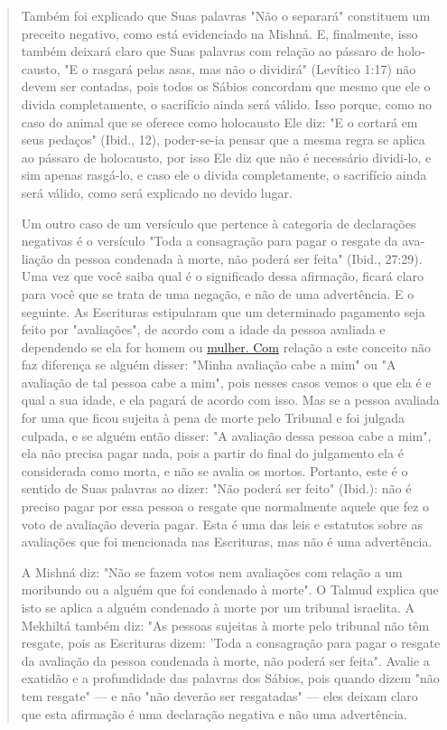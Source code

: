\begin{quote}
Também foi explicado que Suas palavras "Não o separará" consti­tuem um
preceito negativo, como está evidenciado na Mishná. E, finalmente, isso
também deixará claro que Suas palavras com relação ao pássaro de
holo­causto, "E o rasgará pelas asas, mas não o dividirá" (Levítico
1:17) não devem ser contadas, pois todos os Sábios concordam que mesmo
que ele o divida com­pletamente, o sacrifício ainda será válido. Isso
porque, como no caso do ani­mal que se oferece como holocausto Ele diz:
"E o cortará em seus pedaços" (Ibid., 12), poder-se-ia pensar que a
mesma regra se aplica ao pássaro de holo­causto, por isso Ele diz que
não é necessário dividi-lo, e sim apenas rasgá-lo, e caso ele o divida
completamente, o sacrifício ainda será válido, como será explicado no
devido lugar.

Um outro caso de um versículo que pertence à categoria de declara­ções
negativas é o versículo "Toda a consagração para pagar o resgate da
ava­liação da pessoa condenada à morte, não poderá ser feita" (Ibid.,
27:29). Uma vez que você saiba qual é o significado dessa afirmação,
ficará claro para você que se trata de uma negação, e não de uma
advertência. E o seguinte. As Escri­turas estipularam que um determinado
pagamento seja feito por "avaliações", de acordo com a idade da pessoa
avaliada e dependendo se ela for homem ou
\href{http://mulher.Com}{{mulher. Com}} relação a este conceito não faz
diferença se alguém disser: "Mi­nha avaliação cabe a mim" ou "A
avaliação de tal pessoa cabe a mim", pois nesses casos vemos o que ela é
e qual a sua idade, e ela pagará de acordo com isso. Mas se a pessoa
avaliada for uma que ficou sujeita à pena de morte pelo Tribunal e foi
julgada culpada, e se alguém então disser: "A avaliação dessa pes­soa
cabe a mim", ela não precisa pagar nada, pois a partir do final do
julgamen­to ela é considerada como morta, e não se avalia os mortos.
Portanto, este é o sentido de Suas palavras ao dizer: "Não poderá ser
feito" (Ibid.): não é preci­so pagar por essa pessoa o resgate que
normalmente aquele que fez o voto de avaliação deveria pagar. Esta é uma
das leis e estatutos sobre as avaliações que foi mencionada nas
Escrituras, mas não é uma advertência.

A Mishná diz: "Não se fazem votos nem avaliações com relação a um
moribundo ou a alguém que foi condenado à morte". O Talmud explica que
isto se aplica a alguém condenado à morte por um tribunal israelita. A
Mekhiltá também diz: "As pessoas sujeitas à morte pelo tribunal não têm
resgate, pois as Escrituras dizem: 'Toda a consagração para pagar o
resgate da avaliação da pessoa condenada à morte, não poderá ser feita".
Avalie a exatidão e a profun­didade das palavras dos Sábios, pois quando
dizem "não tem resgate" --- e não "não deverão ser resgatadas" --- eles
deixam claro que esta afirmação é uma declaração negativa e não uma
advertência.


\end{quote}
